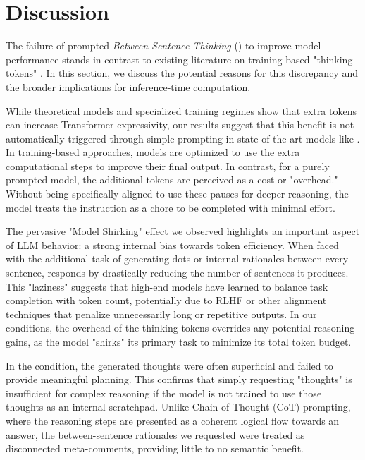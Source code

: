 \section{Discussion}
\label{sec:discussion}

The failure of prompted \textit{Between-Sentence Thinking} (\bst) to improve model performance stands in contrast to existing literature on training-based "thinking tokens" \cite{goyal2023pause, zelikman2024quiet, pfau2024think}. In this section, we discuss the potential reasons for this discrepancy and the broader implications for inference-time computation.

While theoretical models \cite{london2025pause} and specialized training regimes \cite{goyal2023pause} show that extra tokens can increase Transformer expressivity, our results suggest that this benefit is not automatically triggered through simple prompting in state-of-the-art models like \gpt. In training-based approaches, models are optimized to use the extra computational steps to improve their final output. In contrast, for a purely prompted model, the additional tokens are perceived as a cost or "overhead." Without being specifically aligned to use these pauses for deeper reasoning, the model treats the instruction as a chore to be completed with minimal effort.

The pervasive "Model Shirking" effect we observed highlights an important aspect of LLM behavior: a strong internal bias towards token efficiency. When faced with the additional task of generating dots or internal rationales between every sentence, \gpt responds by drastically reducing the number of sentences it produces. This "laziness" suggests that high-end models have learned to balance task completion with token count, potentially due to RLHF or other alignment techniques that penalize unnecessarily long or repetitive outputs. In our \bst conditions, the overhead of the thinking tokens overrides any potential reasoning gains, as the model "shirks" its primary task to minimize its total token budget.

In the \bstrationale condition, the generated thoughts were often superficial and failed to provide meaningful planning. This confirms that simply requesting "thoughts" is insufficient for complex reasoning if the model is not trained to use those thoughts as an internal scratchpad. Unlike Chain-of-Thought (CoT) prompting, where the reasoning steps are presented as a coherent logical flow towards an answer, the between-sentence rationales we requested were treated as disconnected meta-comments, providing little to no semantic benefit.

